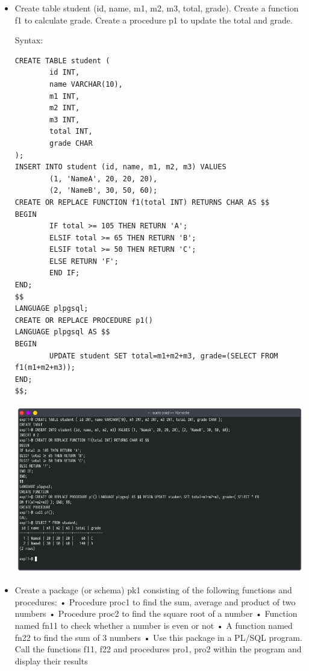 \documentclass[13pt,oneside]{book}
\begin{document}
\begin{itemize}
\item
Create table student (id, name, m1, m2, m3, total, grade). Create a function f1 to
 calculate grade. Create a procedure p1 to update the total and grade.
 
Syntax:
\begin{verbatim}
CREATE TABLE student (
        id INT,
        name VARCHAR(10),
        m1 INT,
        m2 INT,
        m3 INT,
        total INT,
        grade CHAR
);
INSERT INTO student (id, name, m1, m2, m3) VALUES 
        (1, 'NameA', 20, 20, 20),
        (2, 'NameB', 30, 50, 60);
CREATE OR REPLACE FUNCTION f1(total INT) RETURNS CHAR AS $$
BEGIN
        IF total >= 105 THEN RETURN 'A';
        ELSIF total >= 65 THEN RETURN 'B';
        ELSIF total >= 50 THEN RETURN 'C';
        ELSE RETURN 'F';
        END IF;
END;
$$
LANGUAGE plpgsql;
CREATE OR REPLACE PROCEDURE p1()
LANGUAGE plpgsql AS $$
BEGIN
        UPDATE student SET total=m1+m2+m3, grade=(SELECT FROM f1(m1+m2+m3));
END;
$$;

\end{verbatim}
\includegraphics[width=\textwidth]{img/p11/ss3.png}


\item
Create a package (or schema) pk1 consisting of the following functions and
 procedures:
 • Procedure proc1 to find the sum, average and product of two numbers
 • Procedure proc2 to find the square root of a number
 • Function named fn11 to check whether a number is even or not
 • A function named fn22 to find the sum of 3 numbers
 • Use this package in a PL/SQL program. Call the functions f11, f22 and procedures
 pro1, pro2 within the program and display their results


\end{itemize}
\end{document}
